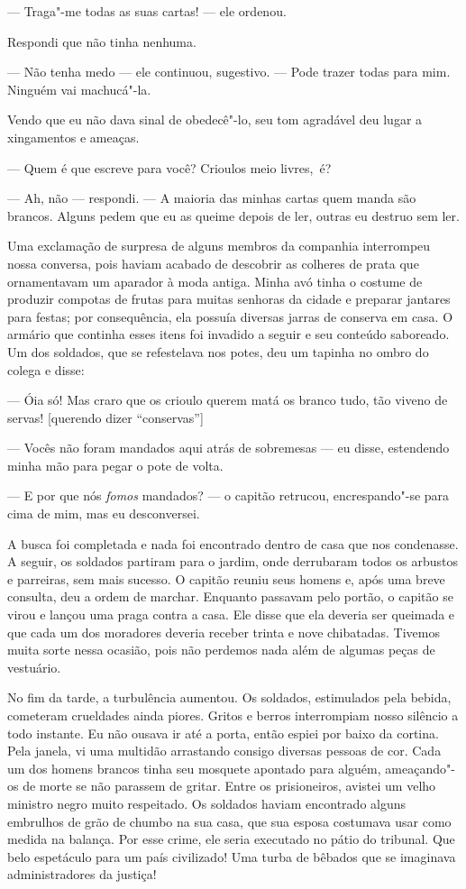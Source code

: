 --- Traga"-me todas as suas cartas! --- ele ordenou.

Respondi que não tinha nenhuma.

--- Não tenha medo --- ele continuou, sugestivo. --- Pode trazer todas
para mim. Ninguém vai machucá"-la.

Vendo que eu não dava sinal de obedecê"-lo, seu tom agradável deu lugar a
xingamentos e ameaças.

--- Quem é que escreve para você? Crioulos meio livres,~é?

--- Ah, não --- respondi. --- A maioria das minhas cartas quem manda são
brancos. Alguns pedem que eu as queime depois de ler, outras eu destruo
sem ler.

Uma exclamação de surpresa de alguns
membros da companhia interrompeu nossa conversa, pois haviam acabado de
descobrir as colheres de prata que ornamentavam um aparador à moda
antiga. Minha avó tinha o costume de produzir compotas de frutas para
muitas senhoras da cidade e preparar jantares para festas; por
consequência, ela possuía diversas jarras de conserva em casa. O armário
que continha esses itens foi invadido a seguir e seu conteúdo saboreado.
Um dos soldados, que se refestelava nos potes, deu um tapinha no ombro
do colega e disse:

--- Óia só! Mas craro que os crioulo querem matá os branco tudo, tão
viveno de servas! {[}querendo dizer ``conservas''{]}

--- Vocês não foram mandados aqui atrás de sobremesas --- eu disse,
estendendo minha mão para pegar o pote de volta.

--- E por que nós \emph{fomos}
mandados? --- o capitão retrucou, encrespando"-se para cima de mim, mas
eu desconversei.

A busca foi completada e nada foi
encontrado dentro de casa que nos condenasse. A seguir, os soldados
partiram para o jardim, onde derrubaram todos os arbustos e parreiras,
sem mais sucesso. O capitão reuniu seus homens e, após uma breve
consulta, deu a ordem de marchar. Enquanto passavam pelo portão, o
capitão se virou e lançou uma praga contra a casa. Ele disse que ela
deveria ser queimada e que cada um dos moradores deveria receber trinta
e nove chibatadas. Tivemos muita sorte nessa ocasião, pois não perdemos
nada além de algumas peças de vestuário.

No fim da tarde, a turbulência
aumentou. Os soldados, estimulados pela bebida, cometeram crueldades
ainda piores. Gritos e berros interrompiam nosso silêncio a todo
instante. Eu não ousava ir até a porta, então espiei por baixo da
cortina. Pela janela, vi uma multidão arrastando consigo diversas
pessoas de cor. Cada um dos homens brancos tinha seu mosquete apontado
para alguém, ameaçando"-os de morte se não parassem de gritar. Entre os
prisioneiros, avistei um velho ministro negro muito respeitado. Os
soldados haviam encontrado alguns embrulhos de grão de chumbo na sua
casa, que sua esposa costumava usar como medida na balança. Por esse
crime, ele seria executado no pátio do tribunal. Que belo espetáculo
para um país civilizado! Uma turba de bêbados que se imaginava
administradores da justiça!

